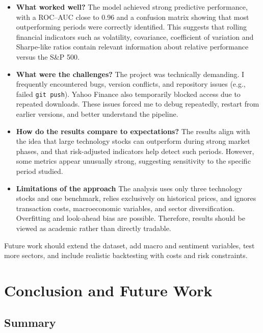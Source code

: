 \documentclass[11pt,a4paper]{article}
\begin{document}
\begin{itemize}

\item \textbf{What worked well?}  
The model achieved strong predictive performance, with a ROC–AUC close to 0.96 and a confusion matrix showing that most outperforming periods were correctly identified. This suggests that rolling financial indicators such as volatility, covariance, coefficient of variation and Sharpe-like ratios contain relevant information about relative performance versus the S\&P 500.

\item \textbf{What were the challenges?}  
The project was technically demanding. I frequently encountered bugs, version conflicts, and repository issues (e.g., failed \texttt{git push}). Yahoo Finance also temporarily blocked access due to repeated downloads. These issues forced me to debug repeatedly, restart from earlier versions, and better understand the pipeline.

\item \textbf{How do the results compare to expectations?}  
The results align with the idea that large technology stocks can outperform during strong market phases, and that risk-adjusted indicators help detect such periods. However, some metrics appear unusually strong, suggesting sensitivity to the specific period studied.

\item \textbf{Limitations of the approach}  
The analysis uses only three technology stocks and one benchmark, relies exclusively on historical prices, and ignores transaction costs, macroeconomic variables, and sector diversification. Overfitting and look-ahead bias are possible. Therefore, results should be viewed as academic rather than directly tradable.

\end{itemize}

\noindent Future work should extend the dataset, add macro and sentiment variables, test more sectors, and include realistic backtesting with costs and risk constraints.
\section{Conclusion and Future Work}
\label{sec:conclusion}

\subsection{Summary}
\end{document}

